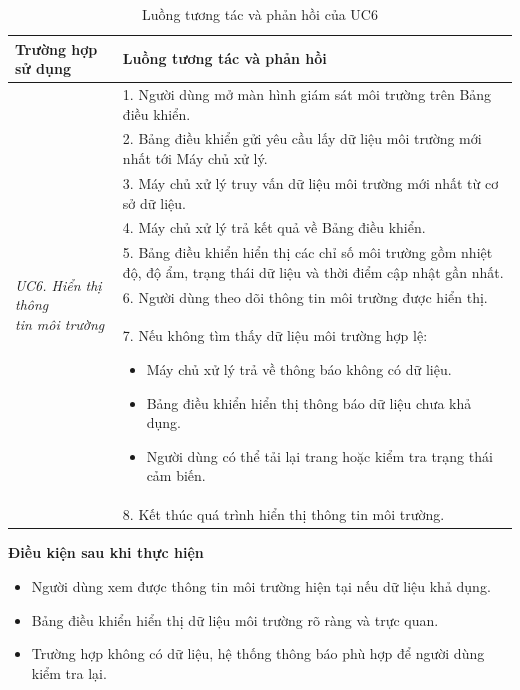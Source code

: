 \documentclass[a4paper,12pt]{article}
\begin{document}
\begin{table}[H]
\centering
\small
\caption{Luồng tương tác và phản hồi của UC6}
\begin{tabularx}{\linewidth}{|p{4cm}|X|}
\hline
\textbf{Trường hợp sử dụng} &
\textbf{Luồng tương tác và phản hồi} \\
\hline

\multirow{13}{=}{\parbox{3.6cm}{\centering\textit{UC6. Hiển thị thông \\tin môi trường}}}
&
1. Người dùng mở màn hình giám sát môi trường trên Bảng điều khiển. \\

&
2. Bảng điều khiển gửi yêu cầu lấy dữ liệu môi trường mới nhất tới Máy chủ xử lý. \\

&
3. Máy chủ xử lý truy vấn dữ liệu môi trường mới nhất từ cơ sở dữ liệu. \\

&
4. Máy chủ xử lý trả kết quả về Bảng điều khiển. \\

&
5. Bảng điều khiển hiển thị các chỉ số môi trường gồm nhiệt độ, độ ẩm, trạng thái dữ liệu và thời điểm cập nhật gần nhất. \\

&
6. Người dùng theo dõi thông tin môi trường được hiển thị. \\

&
7. Nếu không tìm thấy dữ liệu môi trường hợp lệ:
\begin{itemize}
    \item Máy chủ xử lý trả về thông báo không có dữ liệu.
    \item Bảng điều khiển hiển thị thông báo dữ liệu chưa khả dụng.
    \item Người dùng có thể tải lại trang hoặc kiểm tra trạng thái cảm biến.
\end{itemize}
\\

&
8. Kết thúc quá trình hiển thị thông tin môi trường. \\
\hline

\end{tabularx}
\end{table}

\textbf{Điều kiện sau khi thực hiện}

\begin{itemize}
    \item Người dùng xem được thông tin môi trường hiện tại nếu dữ liệu khả dụng.
    \item Bảng điều khiển hiển thị dữ liệu môi trường rõ ràng và trực quan.
    \item Trường hợp không có dữ liệu, hệ thống thông báo phù hợp để người dùng kiểm tra lại.
\end{itemize}
\end{document}
